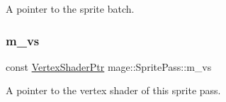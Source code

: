 A pointer to the sprite batch. \hypertarget{classmage_1_1_sprite_pass_a9d84382cfebfea3195ef6cb8ca88d886}{}\label{classmage_1_1_sprite_pass_a9d84382cfebfea3195ef6cb8ca88d886} 
\subsubsection{\texorpdfstring{m\+\_\+vs}{m\_vs}}
{\footnotesize\ttfamily const \hyperlink{namespacemage_a1f19b094f771e30bc0a6c1cebcc0dd58}{Vertex\+Shader\+Ptr} mage\+::\+Sprite\+Pass\+::m\+\_\+vs\hspace{0.3cm}{\ttfamily [private]}}

A pointer to the vertex shader of this sprite pass. 